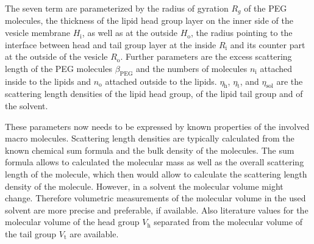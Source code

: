 The seven term are parameterized by the radius of gyration $R_g$ of the PEG molecules, the thickness of the lipid head group layer on the inner side of the vesicle membrane $H_\mathrm{i}$, as well as at the outside $H_\mathrm{o}$, the radius pointing to the interface between head and tail group layer at the inside $R_\mathrm{i}$ and its counter part at the outside of the vesicle $R_\mathrm{o}$. Further parameters are the excess scattering length of the PEG molecules $\beta_\mathrm{PEG}$ and the numbers of molecules $n_\mathrm{i}$ attached inside to the lipids and $n_\mathrm{o}$ attached outside to the lipids. $\eta_\mathrm{h}$, $\eta_\mathrm{t}$, and $\eta_\mathrm{sol}$ are the scattering length densities of the lipid head group, of the lipid tail group and of the solvent.

These parameters now needs to be expressed by known properties of the involved macro molecules. Scattering length densities are typically calculated from the known chemical sum formula and the bulk density of the molecules. The sum formula allows to calculated the molecular mass as well as the overall scattering length of the molecule, which then would allow to calculate the scattering length density of the molecule. However, in a solvent the molecular volume might change. Therefore volumetric measurements of the molecular volume in the used solvent are more precise and preferable, if available. Also literature values for the molecular volume of the head group $V_\mathrm{h}$ separated from the molecular volume of the tail group $V_\mathrm{t}$ are available.

